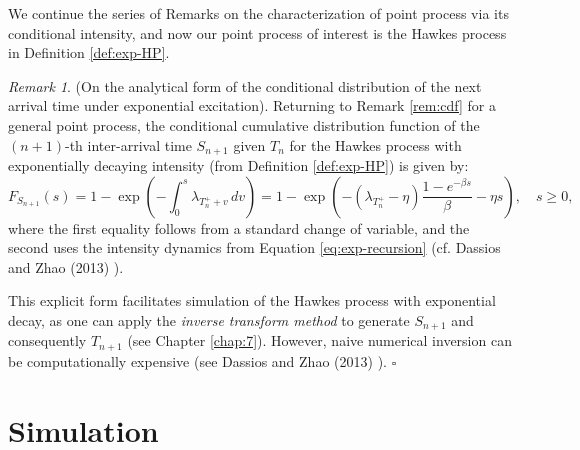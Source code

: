 \documentclass[12pt,a4paper]{report}
\theoremstyle{plain}
\theoremstyle{definition}
\theoremstyle{remark}
\newtheorem{remark}{Remark}[section]
\newcommand{\1}{\mathbf{1}}
\begin{document}
\medskip
\noindent
We continue the series of Remarks on the characterization of point process via its conditional intensity, and now our point process of interest is the Hawkes process in Definition \ref{def:exp-HP}.
\begin{remark}\label{rem:exp-cdf}(On the analytical form of the conditional distribution of the next arrival time under exponential excitation).
\medskip
\noindent
Returning to Remark \ref{rem:cdf} for a general point process, the conditional cumulative distribution function of the \((n+1)\)-th inter-arrival time \(S_{n+1}\) given \(T_n\) for the Hawkes process with exponentially decaying intensity (from Definition \ref{def:exp-HP}) is given by:
\[
F_{S_{n+1}}(s) = 1 - \exp\left(-\int_0^s \lambda_{T_n^+ + v} \, dv\right)
= 1 - \exp\left( -\left(\lambda_{T_n^+} - \eta\right)\frac{1 - e^{-\beta s}}{\beta} - \eta s \right),\quad s\ge0,
\]
where the first equality follows from a standard change of variable, and the second uses the intensity dynamics from Equation \eqref{eq:exp-recursion} (cf. Dassios and Zhao (2013) \cite{DZ13}).

\noindent
This explicit form facilitates simulation of the Hawkes process with exponential decay, as one can apply the \emph{inverse transform method} to generate \(S_{n+1}\) and consequently \(T_{n+1}\) (see Chapter \ref{chap:7}). However, naive numerical inversion can be computationally expensive (see Dassios and Zhao (2013) \cite{DZ13}).
\hfill $\square$
\end{remark}

\part{Simulation}
\label{part:simulation}
\end{document}
